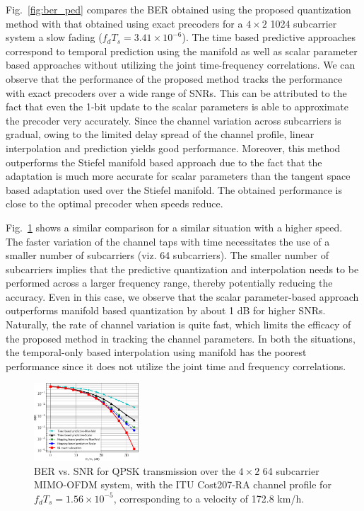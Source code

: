 \documentclass[journal,10pt,twocolumn]{IEEEtran}
\begin{document}
Fig.~\ref{fig:ber_ped} compares the BER obtained using the proposed
quantization method with that obtained using exact precoders for a
$4\times 2$ 1024 subcarrier system a slow fading
($f_dT_s = 3.41 \times 10^{-6}$). The time based predictive approaches
correspond to temporal prediction using the manifold as well as scalar
parameter based approaches without utilizing the joint time-frequency
correlations. We can observe that the performance of the proposed
method tracks the performance with exact precoders over a wide range
of SNRs. This can be attributed to the fact that even the 1-bit update
to the scalar parameters is able to approximate the precoder very
accurately. Since the channel variation across subcarriers is gradual,
owing to the limited delay spread of the channel profile, linear
interpolation and prediction yields good performance. Moreover, this
method outperforms the Stiefel manifold based approach due to the fact
that the adaptation is much more accurate for scalar parameters than
the tangent space based adaptation used over the Stiefel manifold. The
obtained performance is close to the optimal precoder when speeds reduce.

Fig.~\ref{fig:ber_veh} shows a similar comparison for a similar
situation with a higher speed. The faster variation of the channel
taps with time necessitates the use of a smaller number of subcarriers
(viz. 64 subcarriers). The smaller number of subcarriers implies that
the predictive quantization and interpolation needs to be performed
across a larger frequency range, thereby potentially reducing the
accuracy. Even in this case, we observe that the scalar
parameter-based approach outperforms manifold based quantization by
about 1 dB for higher SNRs. Naturally, the rate of channel variation
is quite fast, which limits the efficacy of the proposed method in
tracking the channel parameters. In both the situations, the temporal-only
based interpolation using manifold has the poorest performance since it does
not utilize the joint time and frequency correlations.
\begin{figure}
\begin{center}
\includegraphics[width=0.35\textwidth]{images/64final_withtime}
\caption{BER vs. SNR for QPSK transmission over the $4\times 2$ 64
  subcarrier MIMO-OFDM system, with the ITU Cost207-RA channel profile
  for $f_dT_s = 1.56\times 10^{-5}$, corresponding to a velocity of 172.8 km/h.}
\label{fig:ber_veh}
\end{center}
\end{figure}
\end{document}

